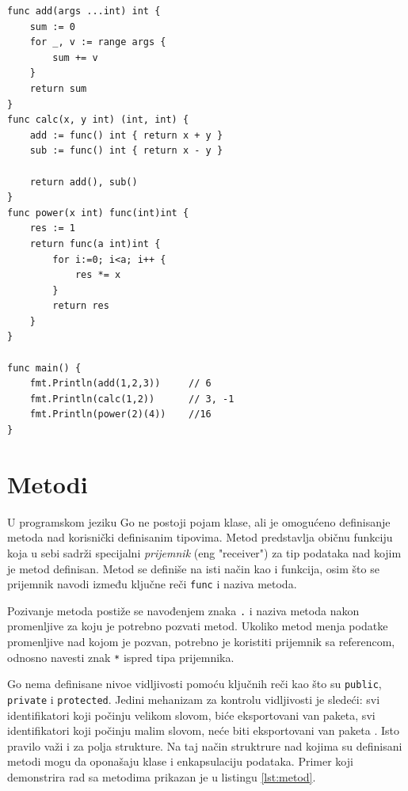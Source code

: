 \documentclass[12pt,oneside]{memoir}
\begin{document}
\begin{center}
\begin{lstlisting}[caption=Primer koji demonstrira rad sa funkcijama, label={lst:func},  backgroundcolor=\color{background}]
func add(args ...int) int {
	sum := 0
	for _, v := range args {
		sum += v
	}
	return sum
}
func calc(x, y int) (int, int) {
	add := func() int { return x + y }
	sub := func() int { return x - y }

	return add(), sub()
}	
func power(x int) func(int)int {
	res := 1
	return func(a int)int {
		for i:=0; i<a; i++ {
			res *= x
		}
		return res
	}
}

func main() {
	fmt.Println(add(1,2,3))		// 6
	fmt.Println(calc(1,2)) 		// 3, -1
	fmt.Println(power(2)(4))	//16
}
\end{lstlisting}
\end{center}

\section{Metodi}  \label{metod}

U programskom jeziku Go ne postoji pojam klase, ali je omogućeno definisanje metoda nad korisnički definisanim tipovima. Metod predstavlja običnu funkciju koja u sebi sadrži specijalni \textit{prijemnik} (eng "receiver") za tip podataka nad kojim je metod definisan. Metod se definiše na isti način kao i funkcija, osim što se prijemnik navodi između ključne reči \texttt{func} i naziva metoda.

Pozivanje metoda postiže se navođenjem znaka \texttt{.} i naziva metoda nakon promenljive za koju je potrebno pozvati metod. Ukoliko metod menja podatke promenljive nad kojom je pozvan, potrebno je koristiti prijemnik sa referencom, odnosno navesti znak \texttt{*} ispred tipa prijemnika. 
 
Go nema definisane nivoe vidljivosti  pomoću ključnih reči kao što su \texttt{public}, \texttt{private} i \texttt{protected}. Jedini mehanizam za kontrolu vidljivosti je sledeći: svi identifikatori koji počinju velikom slovom, biće eksportovani van paketa, svi identifikatori koji počinju malim slovom, neće biti eksportovani van paketa \cite{bookGoProg}. Isto pravilo važi i za polja strukture. Na taj način struktrure nad kojima su definisani metodi mogu da oponašaju klase i enkapsulaciju podataka. Primer koji demonstrira rad sa metodima prikazan je u listingu \ref{lst:metod}.
\end{document}
